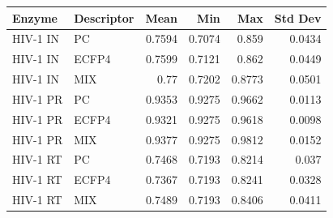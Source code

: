 \begin{tabular}{llrrrr}
\toprule
Enzyme & Descriptor & Mean & Min & Max & Std Dev \\
\midrule
HIV-1 IN & PC & 0.7594 & 0.7074 & 0.859 & 0.0434 \\
HIV-1 IN & ECFP4 & 0.7599 & 0.7121 & 0.862 & 0.0449 \\
HIV-1 IN & MIX & 0.77 & 0.7202 & 0.8773 & 0.0501 \\
HIV-1 PR & PC & 0.9353 & 0.9275 & 0.9662 & 0.0113 \\
HIV-1 PR & ECFP4 & 0.9321 & 0.9275 & 0.9618 & 0.0098 \\
HIV-1 PR & MIX & 0.9377 & 0.9275 & 0.9812 & 0.0152 \\
HIV-1 RT & PC & 0.7468 & 0.7193 & 0.8214 & 0.037 \\
HIV-1 RT & ECFP4 & 0.7367 & 0.7193 & 0.8241 & 0.0328 \\
HIV-1 RT & MIX & 0.7489 & 0.7193 & 0.8406 & 0.0411 \\
\bottomrule
\end{tabular}

